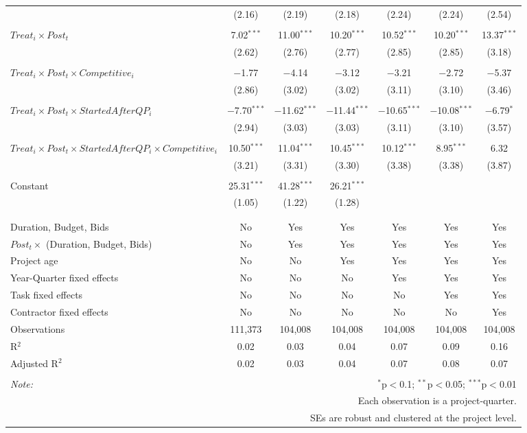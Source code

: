 \documentclass[]{article}
\begin{document}
\begin{table}[H]
\begin{tabular}{@{\extracolsep{-3pt}}lcccccc}
  & (2.16) & (2.19) & (2.18) & (2.24) & (2.24) & (2.54) \\ 
  & & & & & & \\ 
 $Treat_i \times Post_t$ & 7.02$^{***}$ & 11.00$^{***}$ & 10.20$^{***}$ & 10.52$^{***}$ & 10.20$^{***}$ & 13.37$^{***}$ \\ 
  & (2.62) & (2.76) & (2.77) & (2.85) & (2.85) & (3.18) \\ 
  & & & & & & \\ 
 $Treat_i \times Post_t \times Competitive_i$ & $-$1.77 & $-$4.14 & $-$3.12 & $-$3.21 & $-$2.72 & $-$5.37 \\ 
  & (2.86) & (3.02) & (3.02) & (3.11) & (3.10) & (3.46) \\ 
  & & & & & & \\ 
 $Treat_i \times Post_t \times StartedAfterQP_i$ & $-$7.70$^{***}$ & $-$11.62$^{***}$ & $-$11.44$^{***}$ & $-$10.65$^{***}$ & $-$10.08$^{***}$ & $-$6.79$^{*}$ \\ 
  & (2.94) & (3.03) & (3.03) & (3.11) & (3.10) & (3.57) \\ 
  & & & & & & \\ 
 $Treat_i \times Post_t \times StartedAfterQP_i \times Competitive_i$ & 10.50$^{***}$ & 11.04$^{***}$ & 10.45$^{***}$ & 10.12$^{***}$ & 8.95$^{***}$ & 6.32 \\ 
  & (3.21) & (3.31) & (3.30) & (3.38) & (3.38) & (3.87) \\ 
  & & & & & & \\ 
 Constant & 25.31$^{***}$ & 41.28$^{***}$ & 26.21$^{***}$ &  &  &  \\ 
  & (1.05) & (1.22) & (1.28) &  &  &  \\ 
  & & & & & & \\ 
\hline \\[-1.8ex] 
Duration, Budget, Bids & No & Yes & Yes & Yes & Yes & Yes \\ 
$Post_t \times $  (Duration, Budget, Bids) & No & Yes & Yes & Yes & Yes & Yes \\ 
Project age & No & No & Yes & Yes & Yes & Yes \\ 
Year-Quarter fixed effects & No & No & No & Yes & Yes & Yes \\ 
Task fixed effects & No & No & No & No & Yes & Yes \\ 
Contractor fixed effects & No & No & No & No & No & Yes \\ 
Observations & 111,373 & 104,008 & 104,008 & 104,008 & 104,008 & 104,008 \\ 
R$^{2}$ & 0.02 & 0.03 & 0.04 & 0.07 & 0.09 & 0.16 \\ 
Adjusted R$^{2}$ & 0.02 & 0.03 & 0.04 & 0.07 & 0.08 & 0.07 \\ 
\hline 
\hline \\[-1.8ex] 
\textit{Note:}  & \multicolumn{6}{r}{$^{*}$p$<$0.1; $^{**}$p$<$0.05; $^{***}$p$<$0.01} \\ 
 & \multicolumn{6}{r}{Each observation is a project-quarter.} \\ 
 & \multicolumn{6}{r}{SEs are robust and clustered at the project level.} \\ 
\end{tabular} 
\end{table}
\end{document}
